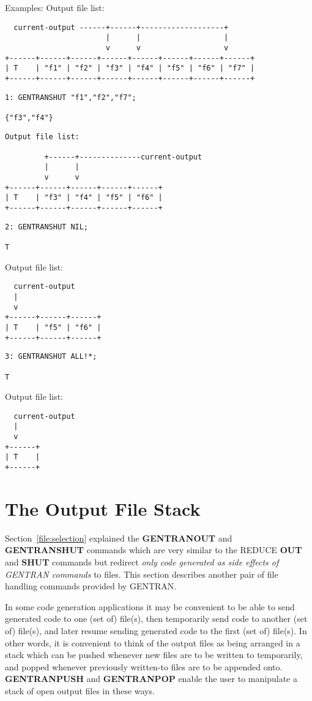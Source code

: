 \begin{describe}{Examples:}
Output file list:
\begin{verbatim}
  current-output ------+------+-------------------+
                       |      |                   |
                       v      v                   v
+------+------+------+------+------+------+------+------+
| T    | "f1" | "f2" | "f3" | "f4" | "f5" | "f6" | "f7" |
+------+------+------+------+------+------+------+------+
\end{verbatim}
\begin{verbatim}
1: GENTRANSHUT "f1","f2","f7"; 

{"f3","f4"}
\end{verbatim}
\begin{verbatim}
Output file list:

         +------+--------------current-output
         |      |
         v      v
+------+------+------+------+------+
| T    | "f3" | "f4" | "f5" | "f6" |
+------+------+------+------+------+
\end{verbatim}
\begin{verbatim}
2: GENTRANSHUT NIL; 

T
\end{verbatim}
Output file list:
\begin{verbatim}
  current-output
  |
  v
+------+------+------+
| T    | "f5" | "f6" |
+------+------+------+
\end{verbatim}
\begin{verbatim}
3: GENTRANSHUT ALL!*; 

T
\end{verbatim}
Output file list:
\begin{verbatim}
  current-output
  |
  v
+------+
| T    |
+------+
\end{verbatim}
\end{describe}

\section{The Output File Stack}
Section~\ref{file:selection}
explained the {\bf GENTRANOUT} and {\bf GENTRANSHUT}
commands which are very similar to the REDUCE {\bf OUT} and {\bf SHUT}
commands but redirect {\it only code generated as side effects of GENTRAN
commands\/} to files.  This section describes another pair of file
handling commands provided by GENTRAN.

In some code generation applications it may be convenient to be
able to send generated code to one (set of) file(s), then
temporarily send code to another (set of) file(s), and later
resume sending generated code to the first (set of) file(s).  In
other words, it is convenient to think of the output files as
being arranged in a stack which can be pushed whenever new
files are to be written to temporarily, and popped whenever
previously written-to files are to be appended onto.  {\bf GENTRANPUSH}
and {\bf GENTRANPOP} enable the user to manipulate a stack of open
output files in these ways.

